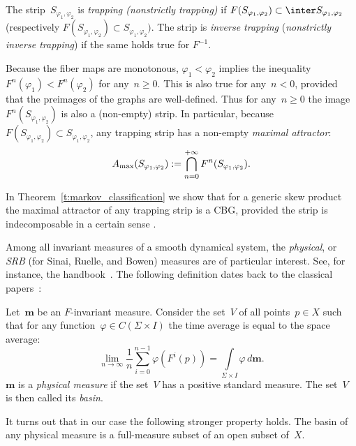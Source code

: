 \documentclass[a4paper,12pt]{amsart}
\begin{document}
\begin{Def}
The strip~$S_{\varphi_1, \varphi_2}$ is \emph{trapping (nonstrictly trapping)} if $F(S_{\varphi_1, \varphi_2}) \subset \inter S_{\varphi_1, \varphi_2}$ (respectively $F(S_{\varphi_1, \varphi_2}) \subset S_{\varphi_1, \varphi_2})$. The strip is \emph{inverse trapping} (\emph{nonstrictly inverse trapping}) if the same holds true for $F^{-1}$.
\end{Def}

\begin{Rem} \label{r:monot_move}
Because the fiber maps are monotonous, $\varphi_1 < \varphi_2$ implies the inequality~$F^n(\varphi_1) < F^n (\varphi_2)$ for any~$n \ge 0$. This is also true for any~$n < 0$, provided that the preimages of the graphs are well-defined. Thus for any~$n \ge 0$ the image~$F^n(S_{\varphi_1, \varphi_2})$ is also a (non-empty) strip.
In particular, because $F(S_{\varphi_1, \varphi_2}) \subset S_{\varphi_1, \varphi_2}$, any trapping strip has a non-empty \emph{maximal attractor}:
\begin{equation}    \label{e:Amax}
A_{\textup{max}}(S_{\varphi_1, \varphi_2}) := \bigcap_{n=0}^{+\infty} F^n (S_{\varphi_1, \varphi_2}).
\end{equation}
\end{Rem}
In Theorem~\ref{t:markov_classification} we show that for a generic skew product the maximal attractor of any trapping strip is a CBG, provided the strip is indecomposable in a certain sense .

Among all invariant measures of a smooth dynamical system, the \emph{physical}, or \emph{SRB} (for Sinai, Ruelle, and Bowen) measures are of particular interest. See, for instance, the handbook~\cite{Barreira2006}. The following definition dates back to the classical papers~\cite{Sinai1972, Ruelle1976, Bowen2008}:
\begin{Def}
Let~$\mathbf{m}$ be an $F$-invariant measure. Consider the set~$V$ of all points~$p \in X$ such that for any function~$\varphi \in C(\Sigma\times I)$ the time average is equal to the space average:
$$
\lim\limits_{n\to\infty} \frac{1}{n}\sum_{i=0}^{n-1} \varphi (F^i(p)) = \int\limits_{\Sigma\times I} \varphi \, d\mathbf{m}.
$$
$\mathbf{m}$ is a \emph{physical measure} if the set~$V$ has a positive standard measure. The set~$V$ is then called its \emph{basin}.
\end{Def}

It turns out that in our case the following stronger property holds. The basin of any physical measure is a full-measure subset of an open subset of~$X$.
\end{document}
